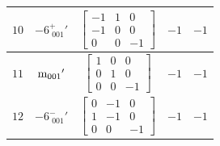 \documentclass[fleqn,8pt]{jsarticle}
\begin{document}
\begin{longtable}{ccccc}
$ 10 $ & $ -6^{+}_{\,\,001}{}' $ & $ \begin{bmatrix} -1 & 1 & 0 \\ -1 & 0 & 0 \\ 0 & 0 & -1 \end{bmatrix} $ & $ -1 $ & $ -1 $ \\ \hline
$ 11 $ & $ {\rm m}_{001}{}' $ & $ \begin{bmatrix} 1 & 0 & 0 \\ 0 & 1 & 0 \\ 0 & 0 & -1 \end{bmatrix} $ & $ -1 $ & $ -1 $ \\ \hline
$ 12 $ & $ -6^{-}_{\,\,001}{}' $ & $ \begin{bmatrix} 0 & -1 & 0 \\ 1 & -1 & 0 \\ 0 & 0 & -1 \end{bmatrix} $ & $ -1 $ & $ -1 $ \\
\end{longtable}
\end{document}
